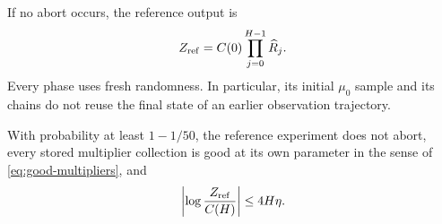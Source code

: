 If no abort occurs, the reference output is
\[
 Z_{\rm ref}=C(0)\prod_{j=0}^{H-1}\widehat R_j.
\]
Every phase uses fresh randomness.  In particular, its initial
\(\mu_0\) sample and its chains do not reuse the final state of an
earlier observation trajectory.

\begin{proposition}
\label{prop:annealing}
With probability at least \(1-1/50\), the reference experiment does
not abort, every stored multiplier collection is good at its own
parameter in the sense of \eqref{eq:good-multipliers}, and
\begin{equation}
 \left|\log\frac{Z_{\rm ref}}{C(H)}\right|
 \leq 4H\eta.
 \label{eq:alg-reference-error}
\end{equation}
\end{proposition}

